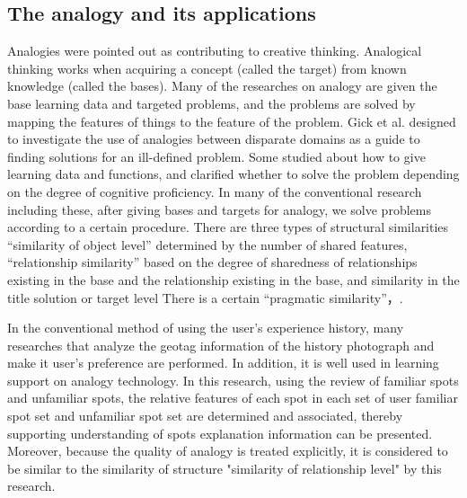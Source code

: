 \documentclass[journal]{IAENGtran}
\begin{document}
\subsection{The analogy and its applications}
\label{subsec:The analogy and its applications}
Analogies were pointed out as contributing to creative thinking\cite{Codd04}.
Analogical thinking works when acquiring a concept (called the target) from known knowledge (called the bases)\cite{Codd05}.
Many of the researches on analogy are given the base learning data and targeted problems, and the problems are solved by mapping the features of things to the feature of the problem\cite{Codd06}.
Gick et al. designed to investigate the use of analogies between disparate domains as a guide to finding solutions for an ill-defined problem.
Some studied about how to give learning data and functions\cite{Codd07}, and clarified whether to solve the problem depending on the degree of cognitive proficiency\cite{Codd08}.
In many of the conventional research including these, after giving bases and targets for analogy, we solve problems according to a certain procedure.
There are three types of structural similarities ``similarity of object level'' determined by the number of shared features, ``relationship similarity'' based on the degree of sharedness of relationships existing in the base and the relationship existing in the base, and similarity in the title solution or target level There is a certain ``pragmatic similarity''\cite{Codd05}，\cite{Codd09}.

In the conventional method of using the user's experience history, many researches that analyze the geotag information of the history photograph and make it user's preference are performed.
In addition, it is well used in learning support on analogy technology.
In this research, using the review of familiar spots and unfamiliar spots, the relative features of each spot in each set of user familiar spot set and unfamiliar spot set are determined and associated, thereby supporting understanding of spots explanation information can be presented.
Moreover, because the quality of analogy is treated explicitly, it is considered to be similar to the similarity of structure "similarity of relationship level" by this research.
\end{document}

